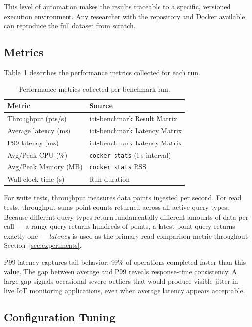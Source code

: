 This level of automation makes the results traceable to a specific, versioned execution
environment. Any researcher with the repository and Docker available can reproduce the full
dataset from scratch.

\subsection{Metrics}
\label{sec:metrics}

Table~\ref{tab:metrics} describes the performance metrics collected for each run.

\begin{table}[ht]
  \centering
  \caption{Performance metrics collected per benchmark run.}
  \label{tab:metrics}
  \begin{tabular}{ll}
    \hline
    \textbf{Metric} & \textbf{Source} \\
    \hline
    Throughput (pts/s)    & iot-benchmark Result Matrix \\
    Average latency (ms)  & iot-benchmark Latency Matrix \\
    P99 latency (ms)      & iot-benchmark Latency Matrix \\
    Avg/Peak CPU (\%)     & \texttt{docker stats} (1\,s interval) \\
    Avg/Peak Memory (MB)  & \texttt{docker stats} RSS \\
    Wall-clock time (s)   & Run duration \\
    \hline
  \end{tabular}
\end{table}

For write tests, throughput measures data points ingested per second. For read tests,
throughput sums point counts returned across all active query types. Because different query
types return fundamentally different amounts of data per call --- a range query returns
hundreds of points, a latest-point query returns exactly one --- \textit{latency} is used
as the primary read comparison metric throughout Section~\ref{sec:experiments}.

P99 latency captures tail behavior: 99\% of operations completed faster than this value.
The gap between average and P99 reveals response-time consistency. A large gap signals
occasional severe outliers that would produce visible jitter in live IoT monitoring applications,
even when average latency appears acceptable.

\subsection{Configuration Tuning}
\label{sec:tuning}

